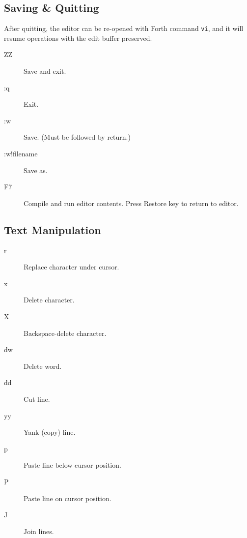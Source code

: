\subsection{Saving \& Quitting}

After quitting, the editor can be re-opened with Forth command \texttt{vi}, and it will resume operations with the edit buffer preserved.

\begin{description}
\item[ZZ] Save and exit.
\item[:q] Exit.
\item[:w] Save. (Must be followed by return.)
\item[:w!filename] Save as.
\item[F7] Compile and run editor contents. Press Restore key to return to editor.
\end{description}

\subsection{Text Manipulation}
\begin{description}
\item[r] Replace character under cursor.
\item[x] Delete character.
\item[X] Backspace-delete character.
\item[dw] Delete word.
\item[dd] Cut line.
\item[yy] Yank (copy) line.
\item[p] Paste line below cursor position.
\item[P] Paste line on cursor position.
\item[J] Join lines.
\end{description}
